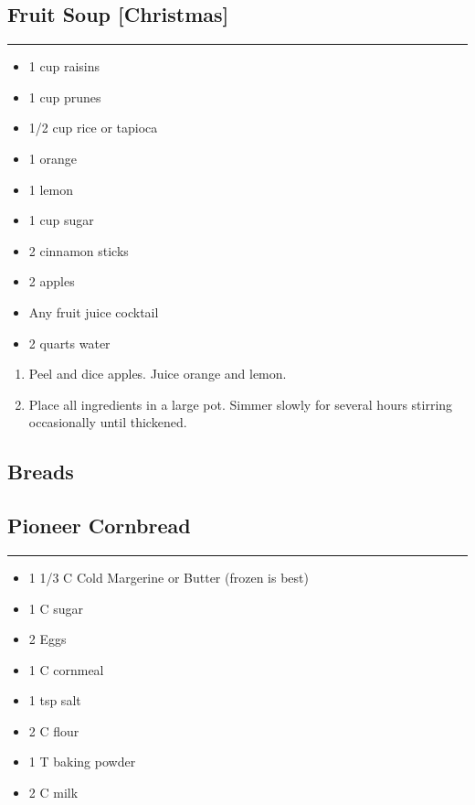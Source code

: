 \documentclass{article}
\begin{document}
\subsection{Fruit Soup [Christmas]} 
\noindent\rule[0.5ex]{\linewidth}{1pt}

\begin{framed}
    \begin{itemize}
        \item 1 cup raisins 
        \item 1 cup prunes 
        \item 1/2 cup rice or tapioca 
        \item 1 orange 
        \item 1 lemon 
        \item 1 cup sugar 
        \item 2 cinnamon sticks 
        \item 2 apples
        \item Any fruit juice cocktail 
        \item 2 quarts water 
    \end{itemize}
\end{framed}

\begin{enumerate}
    \item 
        Peel and dice apples. Juice orange and lemon.
    \item 
        Place all ingredients in a large pot. Simmer slowly for several hours stirring occasionally until thickened.
\end{enumerate}
\newpage

\vspace*{\fill}
\begin{center}
    \section{Breads}
\end{center}
\vspace*{\fill}
\newpage

\subsection{Pioneer Cornbread} 
\noindent\rule[0.5ex]{\linewidth}{1pt}

\begin{framed}
    \begin{itemize}
        \item 1 1/3 C Cold Margerine or Butter (frozen is best)
        \item 1 C sugar
        \item 2 Eggs
        \item 1 C cornmeal
        \item 1 tsp salt
        \item 2 C flour
        \item 1 T baking powder
        \item 2 C milk
    \end{itemize}
\end{framed}
\end{document}
